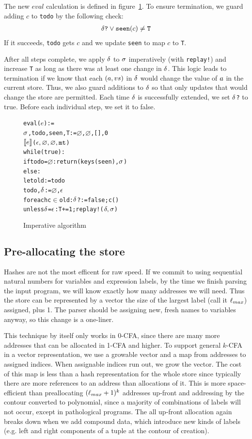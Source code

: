 \documentclass[preprint,onecolumn,9pt]{sigplanconf} %
\begin{document}
The new $eval$ calculation is defined in
figure~\ref{fig:imperative}.  To ensure termination, we guard adding
$c$ to {\tt todo} by the following check:
\begin{align*}\delta\mbox{{\tt ?}} \vee {\tt seen}(c) \neq {\tt T}\end{align*}
If it succeeds, {\tt todo} gets $c$ and we update {\tt seen} to map $c$ to {\tt T}.

After all steps complete, we apply $\delta$ to $\sigma$ imperatively
(with {\tt replay!}) and increase {\tt T} as long as there was at
least one change in $\delta$. This logic leads to termination if we
know that each $(a, v{s})$ in $\delta$ would change
the value of $a$ in the current store. Thus, we also guard
additions to $\delta$ so that only updates that would change the
store are permitted. Each time $\delta$ is successfully extended, we
set {\tt $\delta$?} to true. Before each individual step, we set it
to false.

\begin{figure}
\begin{alltt}
eval(\(e\)) :=
  \(\msto\), todo, seen, T := \(\varnothing\), \(\varnothing\), [], 0
  \(\compile{e}\)(\(\mtcntr, \varnothing, \varnothing, \kmt\))
  while(true):
    if todo = \(\varnothing\): return (keys(seen), \(\msto\))
    else:
      let old := todo
      todo, \(\msdiff\) := \(\varnothing\), \(\mtlst\)
      foreach c \(\in\) old: \(\msdiff\)? := false; c()
      unless \(\msdiff\) = \(\mtlst\): T += 1; replay!(\(\msdiff, \msto\))
\end{alltt}
\caption{Imperative algorithm}
\label{fig:imperative}
\end{figure}

\subsection{Pre-allocating the store}
Hashes are not the most efficent for raw speed. If we commit to using
sequential natural numbers for variables and expression labels, by the
time we finish parsing the input program, we will know exactly how
many addresses we will need. Thus the store can be represented by a
vector the size of the largest label (call it ${\ell}_{max}$) assigned, plus
1. The parser should be assigning new, fresh names to variables
anyway, so this change is a one-liner.

This technique by itself only works in 0-CFA, since there are many
more addresses that can be allocated in 1-CFA and higher. To support
general $k$-CFA in a vector representation, we use a growable vector
and a map from addresses to assigned indices. When assignable indices
run out, we grow the vector. The cost of this map is less than a hash
representation for the whole store since typically there are more
references to an address than allocations of it. This is more
space-efficient than preallocating $({\ell}_{max}+1)^k$ addresses
up-front and addressing by the contour converted to polynomial, since
a majority of combinations of labels will not occur, except in
pathological programs. The all up-front allocation again breaks down
when we add compound data, which introduce new kinds of labels
(e.g. left and right components of a tuple at the contour of
creation).
\end{document}
